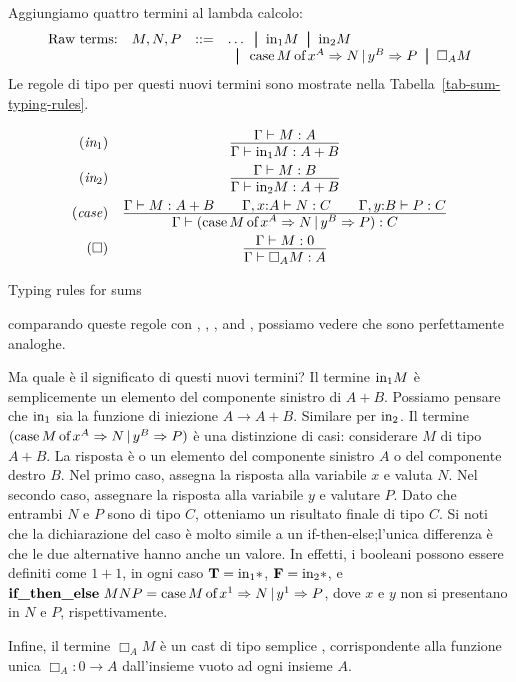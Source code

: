 \documentclass{article}
\begin{document}
Aggiungiamo quattro termini al lambda calcolo:
\[ \begin{array}{lll}
  \mbox{Raw terms:}\ssep M,N,P &\bnf&\ldots\bor \inj1 M\bor \inj2 M \\
  && \bor
  \caseof{M}{x}{A}{N}{y}{B}{P} \bor \Box_A M
\end{array}
\]
Le regole di tipo per questi nuovi termini sono mostrate nella
Tabella~\ref{tab-sum-typing-rules}.
\begin{table*}[tbp]
\[ \begin{array}{rc}
        \tjinja
&       \deriv{\Gamma\tj M:A}{\Gamma\tj \inj1 M:A+B}
\nl     \tjinjb
&       \deriv{\Gamma\tj M:B}{\Gamma\tj \inj2 M:A+B}
\nl     \tjcase
&       \deriv{\Gamma\tj M: A+B\sep\Gamma,\typ{x}{A}\tj N: C
  \sep\Gamma,\typ{y}{B}\tj P: C}
                {\Gamma\tj (\caseof{M}{x}{A}{N}{y}{B}{P}): C}
\nl     \tjbox
&       \deriv{\Gamma\tj M: 0}
                {\Gamma\tj\Box_A M:A}
\end{array}
\]
\caption{Typing rules for sums}
\label{tab-sum-typing-rules}
\end{table*}
comparando queste regole con ,
, , and , possiamo vedere 
che sono perfettamente analoghe.

Ma quale \`e il significato di questi nuovi termini? Il termine $\mbox{\rm in}_1 M$ \`e semplicemente 
un elemento del componente sinistro di $A+B$. Possiamo pensare che 
$\mbox{\rm in}_1$ sia la funzione di iniezione $A\to A+B$. Similare per $\mbox{\rm in}_2$.
Il termine $(\mathop{\mbox{\rm case}}M\mathop{\mbox{\rm of}}x^A\Rightarrow N\mathop{|}y^B\Rightarrow P)$ \`e una distinzione di casi:
considerare $M$ di tipo $A+B$. La risposta \`e o un elemento del
componente sinistro $A$  o del componente destro $B$. Nel primo caso,
assegna la risposta alla variabile $x$ e valuta $N$. Nel secondo
caso, assegnare la risposta alla variabile $y$ e valutare $P$. Dato che
entrambi $N$ e $P$ sono di tipo $C$, otteniamo un risultato finale di tipo $C$.
Si noti che la dichiarazione del caso \`e molto simile a un if-then-else;l'unica differenza 
\`e che le due alternative hanno anche un valore.
In effetti, i booleani possono essere definiti come $1+1$, in ogni caso
${\bf T}=\mbox{\rm in}_1{*}$, ${\bf F}=\mbox{\rm in}_2{*}$, e $\mathop{\textbf{\bf if\_then\_else}\,}
MNP=\mathop{\mbox{\rm case}}M\mathop{\mbox{\rm of}}x^1\Rightarrow N\mathop{|}y^1\Rightarrow P$, dove $x$ e $y$ non si presentano in
$N$ e $P$, rispettivamente.

Infine, il termine $\Box_A M$ \`e un cast di tipo semplice , corrispondente alla
funzione unica $\Box_A:0\to A$ dall'insieme vuoto ad ogni insieme $A$.
\end{document}
